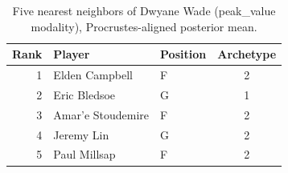 \begin{table}[htbp]
  \centering\small
  \begin{tabular}{rllc}
    \toprule
    Rank & Player & Position & Archetype \\
    \midrule
    1 & Elden Campbell & F & 2 \\
    2 & Eric Bledsoe & G & 1 \\
    3 & Amar'e Stoudemire & F & 2 \\
    4 & Jeremy Lin & G & 2 \\
    5 & Paul Millsap & F & 2 \\
    \bottomrule
  \end{tabular}
  \caption{Five nearest neighbors of Dwyane Wade (peak_value modality), Procrustes-aligned posterior mean.}
  \label{tab:Dwyane_Wade_neighbors_peak_value}
\end{table}

